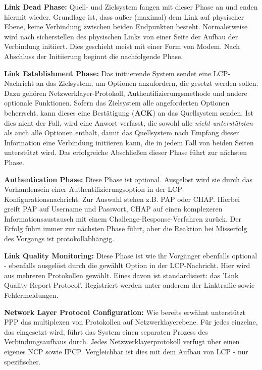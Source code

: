\textbf{Link Dead Phase:}
Quell- und Zielsystem fangen mit dieser Phase an und enden hiermit wieder.
Grundlage ist, dass außer (maximal) dem Link auf physischer Ebene,
keine Verbindung zwischen beiden Endpunkten besteht. Normalerweise
wird nach sicherstellen des physischen Links von einer Seite der
Aufbau der Verbindung initiiert. Dies geschieht meist mit einer Form von Modem.
Nach Abschluss der Initiierung beginnt die nachfolgende Phase.

\textbf{Link Establishment Phase:}
Das initiierende System sendet eine \ac{LCP}-Nachricht an das Zielsystem,
um Optionen anzufordern, die gesetzt werden sollen. Dazu gehören
Netzwerklayer-Protokoll, Authentifizierungsmethode und andere optionale
Funktionen. Sofern das Zielsystem alle angeforderten Optionen beherrscht,
kann dieses eine Bestätigung (\textbf{ACK}) an das Quellsystem senden.
Ist dies nicht der Fall, wird eine Anwort verfasst, die sowohl alle
\textit{nicht unterstützten} als auch alle  Optionen
enthält, damit das Quellsystem nach Empfang dieser Information eine
Verbindung initiieren kann, die in jedem Fall von beiden Seiten unterstützt
wird. Das erfolgreiche Abschließen dieser Phase führt zur nächsten Phase.

\textbf{Authentication Phase:}
Diese Phase ist optional. Ausgelöst wird sie durch das Vorhandensein einer
Authentifizierungsoption in der LCP-Konfigurationsnachricht.
Zur Auswahl stehen z.B. \ac{PAP} oder \ac{CHAP}.
Hierbei greift PAP auf Username und Passwort, CHAP auf einen komplexeren Informationsaustausch
mit einem Challenge-Response-Verfahren zurück. Der Erfolg führt immer zur nächsten
Phase führt, aber die Reaktion bei Misserfolg des Vorgangs ist protokollabhängig.

\textbf{Link Quality Monitoring:}
Diese Phase ist wie ihr Vorgänger ebenfalls optional - ebenfalls ausgelöst durch
die gewählt Option in der LCP-Nachricht.
Hier wird aus mehreren Protokollen gewählt. Eines davon ist standardisiert:
das 'Link Quality Report Protocol'. Registriert werden unter anderem der Linktraffic
sowie Fehlermeldungen.

\textbf{Network Layer Protocol Configuration:}
Wie bereits erwähnt unterstützt PPP  das multiplexen von Protokollen auf
Netzwerklayerebene. Für jedes einzelne, das eingesetzt wird,
führt das System einen separaten Prozess des Verbindungsaufbaus durch.
Jedes Netzwerklayerprotokoll verfügt über einen eigenes \ac{NCP} sowie \ac{IPCP}.
Vergleichbar ist dies mit dem Aufbau von \ac{LCP} - nur spezifischer.

